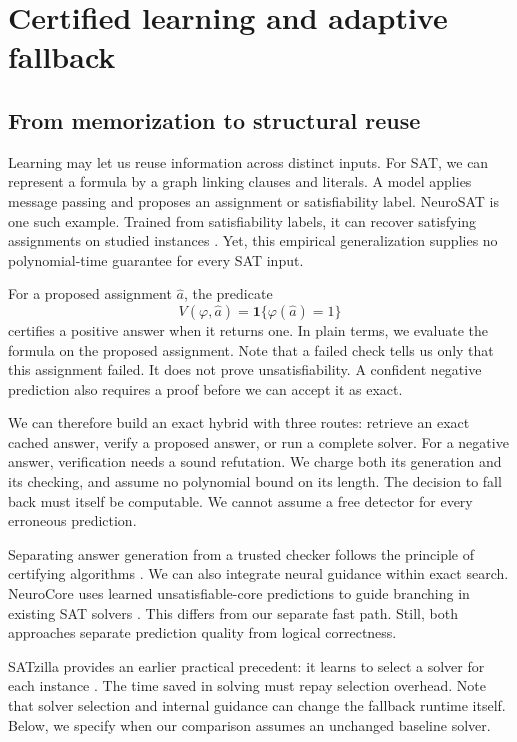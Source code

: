 \documentclass[11pt,a4paper]{article}
\numberwithin{equation}{section}
\newcommand{\ind}{\mathbf{1}}
\theoremstyle{plain}
\theoremstyle{definition}
\theoremstyle{remark}
\begin{document}
\section{Certified learning and adaptive fallback}
\label{sec:hybrid}

\subsection{From memorization to structural reuse}

Learning may let us reuse information across distinct inputs. For SAT, we can represent a formula by a graph linking clauses and literals. A model applies message passing and proposes an assignment or satisfiability label. NeuroSAT is one such example. Trained from satisfiability labels, it can recover satisfying assignments on studied instances \citep{selsam2019}. Yet, this empirical generalization supplies no polynomial-time guarantee for every SAT input.

For a proposed assignment $\widehat a$, the predicate
\begin{equation}
V(\varphi,\widehat a)=\ind\{\varphi(\widehat a)=1\}
\end{equation}
certifies a positive answer when it returns one. In plain terms, we evaluate the formula on the proposed assignment. Note that a failed check tells us only that this assignment failed. It does not prove unsatisfiability. A confident negative prediction also requires a proof before we can accept it as exact.

We can therefore build an exact hybrid with three routes: retrieve an exact cached answer, verify a proposed answer, or run a complete solver. For a negative answer, verification needs a sound refutation. We charge both its generation and its checking, and assume no polynomial bound on its length. The decision to fall back must itself be computable. We cannot assume a free detector for every erroneous prediction.

Separating answer generation from a trusted checker follows the principle of certifying algorithms \citep{mcconnell2011}. We can also integrate neural guidance within exact search. NeuroCore uses learned unsatisfiable-core predictions to guide branching in existing SAT solvers \citep{selsam2019core}. This differs from our separate fast path. Still, both approaches separate prediction quality from logical correctness.

SATzilla provides an earlier practical precedent: it learns to select a solver for each instance \citep{xu2008satzilla}. The time saved in solving must repay selection overhead. Note that solver selection and internal guidance can change the fallback runtime itself. Below, we specify when our comparison assumes an unchanged baseline solver.
\end{document}
